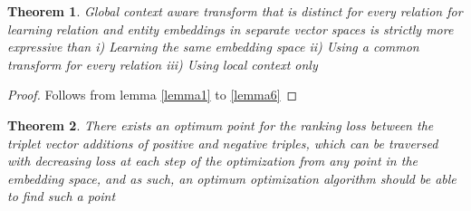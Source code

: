 \documentclass[sigconf]{acmart}
\newtheorem{theorem}{Theorem}[section]
\begin{document}
\begin{theorem}\label{theorem1}
Global context aware transform that is distinct for every relation for learning relation and entity embeddings in separate vector spaces is strictly more expressive than i) Learning the same embedding space ii) Using a common transform for every relation iii) Using local context only
\end{theorem}
\begin{proof}
Follows from lemma \ref{lemma1} to \ref{lemma6}
\end{proof}

\begin{theorem}\label{algo1_t1}
 There exists an optimum point for the ranking loss between the triplet vector additions of positive and negative triples, which can be traversed with decreasing loss at each step of the optimization from any point in the embedding space, and as such, an optimum optimization algorithm should be able to find such a point
\end{theorem}
\end{document}
